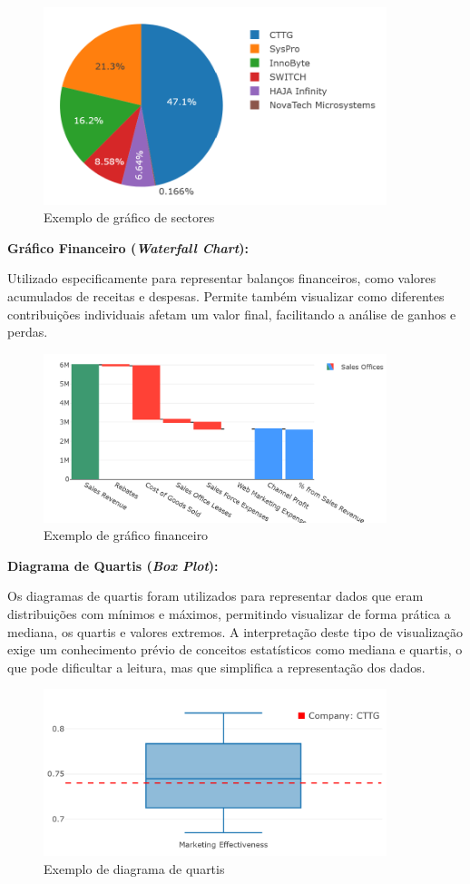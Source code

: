 \begin{figure}[H]
    \centering
    \includegraphics[max width=10cm]{./img/pie}
    \caption{Exemplo de gráfico de sectores}
\end{figure}

\textbf{Gráfico Financeiro (\textit{Waterfall Chart}):}  

Utilizado especificamente para representar balanços financeiros, como valores acumulados de receitas e despesas. Permite também visualizar como diferentes contribuições individuais afetam um valor final, facilitando a análise de ganhos e perdas.

\begin{figure}[H]
    \centering
    \includegraphics[max width=10cm]{./img/waterfall}
    \caption{Exemplo de gráfico financeiro}
\end{figure}

\textbf{Diagrama de Quartis (\textit{Box Plot}):}

Os diagramas de quartis foram utilizados para representar dados que eram distribuições com mínimos e máximos, permitindo visualizar de forma prática a mediana, os quartis e valores extremos.  A interpretação deste tipo de visualização exige um conhecimento prévio de conceitos estatísticos como mediana e quartis, o que pode dificultar a leitura, mas que simplifica a representação dos dados.

\begin{figure}[H]
    \centering
    \includegraphics[max width=10cm]{./img/box}
    \caption{Exemplo de diagrama de quartis}
\end{figure}

